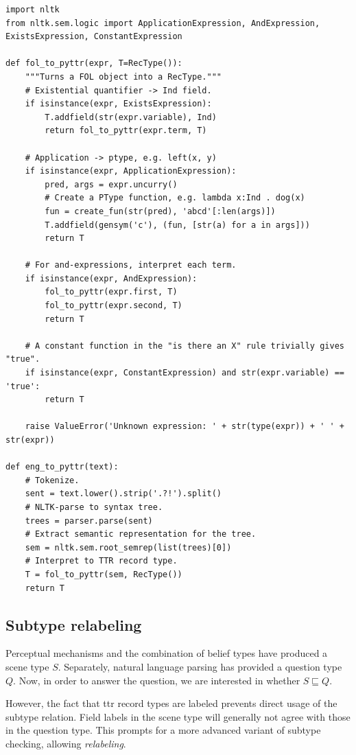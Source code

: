 \begin{lstlisting}[label=lst:foltopyttr, caption=Translation from \gls{fol} to \gls{ttr}.]
import nltk
from nltk.sem.logic import ApplicationExpression, AndExpression, ExistsExpression, ConstantExpression

def fol_to_pyttr(expr, T=RecType()):
    """Turns a FOL object into a RecType."""
    # Existential quantifier -> Ind field.
    if isinstance(expr, ExistsExpression):
        T.addfield(str(expr.variable), Ind)
        return fol_to_pyttr(expr.term, T)
    
    # Application -> ptype, e.g. left(x, y)
    if isinstance(expr, ApplicationExpression):
        pred, args = expr.uncurry()
        # Create a PType function, e.g. lambda x:Ind . dog(x)
        fun = create_fun(str(pred), 'abcd'[:len(args)])
        T.addfield(gensym('c'), (fun, [str(a) for a in args]))
        return T
    
    # For and-expressions, interpret each term.
    if isinstance(expr, AndExpression):
        fol_to_pyttr(expr.first, T)
        fol_to_pyttr(expr.second, T)
        return T
    
    # A constant function in the "is there an X" rule trivially gives "true".
    if isinstance(expr, ConstantExpression) and str(expr.variable) == 'true':
        return T
    
    raise ValueError('Unknown expression: ' + str(type(expr)) + ' ' + str(expr))

def eng_to_pyttr(text):
    # Tokenize.
    sent = text.lower().strip('.?!').split()
    # NLTK-parse to syntax tree.
    trees = parser.parse(sent)
    # Extract semantic representation for the tree.
    sem = nltk.sem.root_semrep(list(trees)[0])
    # Interpret to TTR record type.
    T = fol_to_pyttr(sem, RecType())
    return T
\end{lstlisting}



\subsection{Subtype relabeling}
\label{sec:subtyperelabeling}

Perceptual mechanisms and the combination of belief types have produced a scene type $S$.
Separately, natural language parsing has provided a question type $Q$.
Now, in order to answer the question, we are interested in whether $S \sqsubseteq Q$.

However, the fact that \gls{ttr} record types are labeled prevents direct usage of the subtype relation.
Field labels in the scene type will generally not agree with those in the question type.
This prompts for a more advanced variant of subtype checking, allowing \textit{relabeling}.

